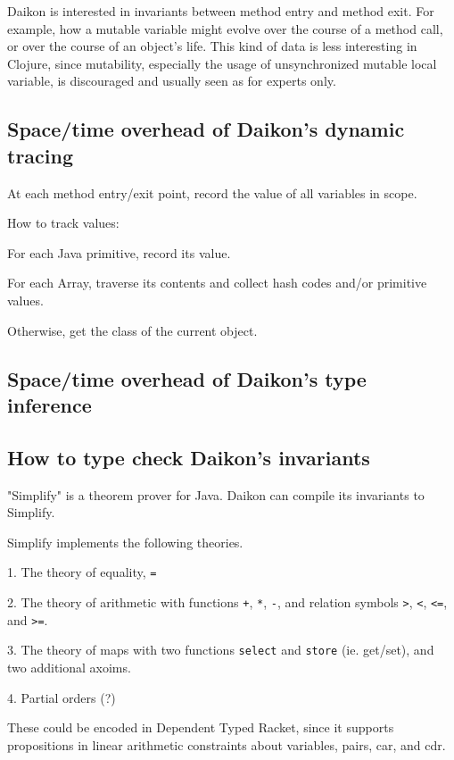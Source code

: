 \documentclass[10pt]{article}
\begin{document}
Daikon is interested in invariants between method entry and method exit. For example,
how a mutable variable might evolve over the course of a method call, or over the course
of an object's life. This kind of data is less interesting in Clojure, since mutability,
especially the usage of unsynchronized mutable local variable, is discouraged and usually
seen as for experts only.


\subsection*{Space/time overhead of Daikon's dynamic tracing}

At each method entry/exit point, record the value of all variables in scope.

How to track values:

For each Java primitive, record its value.

For each Array, traverse its contents and collect hash codes
and/or primitive values.

Otherwise, get the class of the current object.

\subsection*{Space/time overhead of Daikon's type inference}

\subsection*{How to type check Daikon's invariants}

"Simplify" is a theorem prover for Java. Daikon can compile its invariants
to Simplify.

Simplify implements the following theories.

1. The theory of equality, \texttt{=}

2. The theory of arithmetic with functions \texttt{+}, \texttt{*}, \texttt{-},
	 and relation symbols \texttt{>}, \texttt{<}, \texttt{<=}, and \texttt{>=}.

3. The theory of maps with two functions \texttt{select} and \texttt{store} (ie. get/set),
	 and two additional axoims.

4. Partial orders (?)

These could be encoded in Dependent Typed Racket, since it supports propositions
in linear arithmetic constraints about variables, pairs, car, and cdr.
\end{document}
